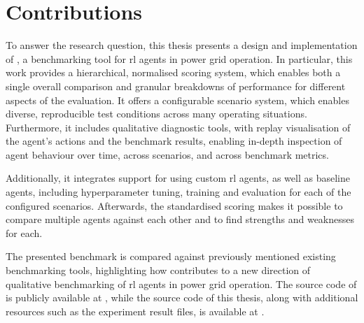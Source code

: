 \section{Contributions}\label{sec:contributions}
To answer the research question, this thesis presents a design and implementation of \benchmark, a benchmarking tool for \ac{rl} agents in power grid operation. In particular, this work provides a hierarchical, normalised scoring system, which enables both a single overall comparison and granular breakdowns of performance for different aspects of the evaluation. It offers a configurable scenario system, which enables diverse, reproducible test conditions across many operating situations. Furthermore, it includes qualitative diagnostic tools, with replay visualisation of the agent's actions and the benchmark results, enabling in-depth inspection of agent behaviour over time, across scenarios, and across benchmark metrics. 

Additionally, it integrates support for using custom \ac{rl} agents, as well as baseline agents, including hyperparameter tuning, training and evaluation for each of the configured scenarios. Afterwards, the standardised scoring makes it possible to compare multiple agents against each other and to find strengths and weaknesses for each. 

The presented benchmark is compared against previously mentioned existing benchmarking tools, highlighting how \benchmark contributes to a new direction of qualitative benchmarking of \ac{rl} agents in power grid operation. The source code of \benchmark is publicly available at \coderepo, while the source code of this thesis, along with additional resources such as the experiment result files, is available at \thesisrepo.





